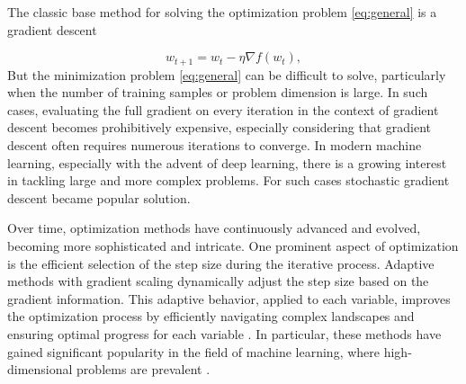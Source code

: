 \documentclass[USenglish]{article}
\theoremstyle{dgthm}
\theoremstyle{dgdef}
\begin{document}
The classic base method for solving the optimization problem \eqref{eq:general} is a gradient descent

\begin{equation}
    \label{GD}
	w_{t+1} = w_t - \eta \nabla f(w_t),
\end{equation}
But the minimization problem \eqref{eq:general} can be difficult to solve, particularly when the number of training samples or problem dimension is large.
In such cases, evaluating the full gradient on every iteration in the context of gradient descent becomes prohibitively expensive, especially considering that gradient descent often requires numerous iterations to converge.
In modern machine learning, especially with the advent of deep learning, there is a growing interest in tackling large and more complex problems.
For such cases stochastic gradient descent \citep{robbins1951stochastic} became popular solution.

Over time, optimization methods have continuously advanced and evolved, becoming more sophisticated and intricate.
One prominent aspect of optimization is the efficient selection of the step size during the iterative process.
Adaptive methods with gradient scaling dynamically adjust the step size based on the gradient information. This adaptive behavior, applied to each variable, improves the optimization process by efficiently navigating complex landscapes and ensuring optimal progress for each variable \citep{hazan2007adaptive}.
In particular, these methods have gained significant popularity in the field of machine learning, where high-dimensional problems are prevalent \citep{zhang2018three, yao2021adahessian}.
\end{document}
